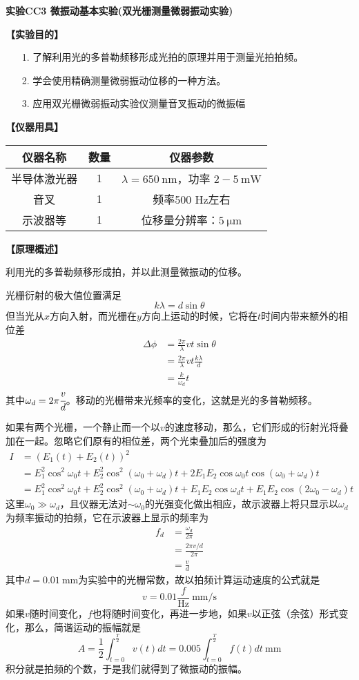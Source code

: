 \documentclass[11pt,a4paper]{ctexart}
\newcommand{\ExpeName}{实验CC3 微振动基本实验(双光栅测量微弱振动实验)}
\newcommand{\beq}{\begin{equation}}
\newcommand{\eeq}{\end{equation}}
\newcommand{\bea}{\begin{equation}\begin{aligned}}
\newcommand{\eea}{\end{aligned}\end{equation}}
\begin{document}
\newpage%
\begin{center}
\LARGE{\textbf{\ExpeName}}
\end{center}
\textbf{【实验目的】}
\begin{enumerate}
 \item[1.] 了解利用光的多普勒频移形成光拍的原理并用于测量光拍拍频。
 \item[2.] 学会使用精确测量微弱振动位移的一种方法。
 \item[3.] 应用双光栅微弱振动实验仪测量音叉振动的微振幅
\end{enumerate}
\textbf{【仪器用具】}
\begin{table}[h!]
\centering
\begin{tabular}{|c|c|c|}
\hline
仪器名称 & 数量 & 仪器参数 \\ \hline
半导体激光器 & 1 & $\lambda=650\mathrm{\ nm}$，功率 $2-5\mathrm{\ mW}$ \\ \hline
音叉 & 1 & 频率500 Hz左右 \\ \hline
示波器等 & 1 & 位移量分辨率：$5\mathrm{\ \mu m}$ \\ \hline
\end{tabular}
\end{table}
\textbf{【原理概述】}\par
利用光的多普勒频移形成拍，并以此测量微振动的位移。
\par
光栅衍射的极大值位置满足
\beq
k\lambda = d\sin \theta
\eeq
但当光从$x$方向入射，而光栅在$y$方向上运动的时候，它将在$t$时间内带来额外的相位差
\bea
\Delta \phi &= \frac{2\pi}{\lambda} vt\sin \theta \\
&= \frac{2\pi}{\lambda}vt\frac{k\lambda}{d} \\
&= \frac{k}{\omega_d} t
\eea
其中$\omega_d = 2\pi \cfrac{v}{d}$。移动的光栅带来光频率的变化，这就是光的多普勒频移。
\par
如果有两个光栅，一个静止而一个以$v$的速度移动，那么，它们形成的衍射光将叠加在一起。忽略它们原有的相位差，两个光束叠加后的强度为
\bea
I &= (E_1(t) +E_2(t))^2 \\
&= E_1^2 \cos^2 \omega_0 t + E_2^2 \cos^2 (\omega_0 + \omega_d)t + 2E_1 E_2 \cos \omega_0 t \cos (\omega_0 + \omega_d)t \\
&= E_1^2 \cos^2 \omega_0 t + E_2^2 \cos^2 (\omega_0 + \omega_d)t + E_1 E_2 \cos \omega_d t + E_1 E_2 \cos (2\omega_0 - \omega_d)t
\eea
这里$\omega_0 \gg \omega_d$，且仪器无法对$\sim \omega_0$的光强变化做出相应，故示波器上将只显示以$\omega_d$为频率振动的拍频，它在示波器上显示的频率为
\bea
f_d &= \frac{\omega_d}{2\pi} \\
&= \frac{2\pi v/d}{2\pi} \\
&= \frac{v}{d}
\eea
其中$d = 0.01\mathrm{\ mm}$为实验中的光栅常数，故以拍频计算运动速度的公式就是
\beq
v = 0.01\frac{f}{\mathrm{Hz}} \mathrm{\ mm/s}
\eeq
如果$v$随时间变化，$f$也将随时间变化，再进一步地，如果$v$以正弦（余弦）形式变化，那么，简谐运动的振幅就是
\beq
A = \frac{1}{2} \int_{t=0}^{\frac{T}{2}} v(t) dt = 0.005 \int_{t=0}^{\frac{T}{2}} f(t)dt\mathrm{\ mm} 
\eeq
积分就是拍频的个数，于是我们就得到了微振动的振幅。
\end{document}
